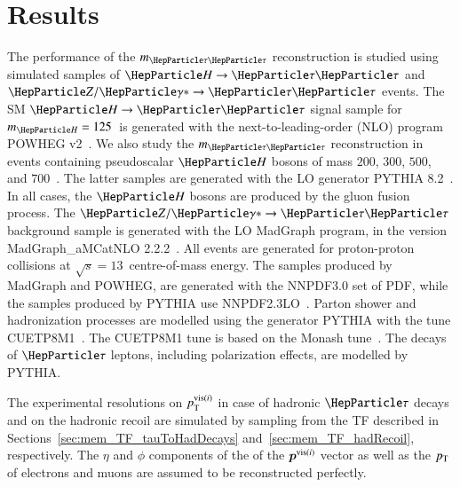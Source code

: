 \section{Results}
\label{sec:results}

The performance of the $m_{\Pgt\Pgt}$ reconstruction is studied using
simulated samples of $\PHiggs \to \Pgt\Pgt$ and $\PZ/\Pggx \to
\Pgt\Pgt$ events.
The SM $\PHiggs \to \Pgt\Pgt$ signal sample for $m_{\PHiggs} = 125$~\GeV is generated with the next-to-leading-order (NLO) program POWHEG v2~\cite{POWHEG1,POWHEG2,POWHEG3}.
We also study the $m_{\Pgt\Pgt}$ reconstruction in events containing pseudoscalar $\PHiggs$ bosons of mass $200$, $300$, $500$, and $700$~\GeV.
The latter samples are generated with the LO generator PYTHIA 8.2~\cite{pythia8}.
In all cases, the $\PHiggs$ bosons are produced by the gluon fusion process.
The $\PZ/\Pggx \to \Pgt\Pgt$ background sample is generated with the LO MadGraph program, in the version MadGraph\_aMCatNLO 2.2.2~\cite{MadGraph_aMCatNLO}.
All events are generated for proton-proton collisions at $\sqrt{s} = 13$~\TeV centre-of-mass energy.
The samples produced by MadGraph and POWHEG, are generated with the NNPDF3.0 set of PDF,
while the samples produced by PYTHIA use NNPDF2.3LO~\cite{NNPDF1,NNPDF2,NNPDF3}.
Parton shower and hadronization processes are modelled using the generator PYTHIA with the tune CUETP8M1~\cite{PYTHIA_CUETP8M1tune_CMS}.
The CUETP8M1 tune is based on the Monash tune~\cite{PYTHIA_MonashTune}.
The decays of $\Pgt$ leptons, including polarization effects, are modelled by PYTHIA.

The experimental resolutions on $p_{\textrm{T}}^{\textrm{vis}(i)}$ in case of hadronic
$\Pgt$ decays and on the hadronic recoil 
are simulated by sampling from the TF described in
Sections~\ref{sec:mem_TF_tauToHadDecays}
and~\ref{sec:mem_TF_hadRecoil}, respectively.
The $\eta$ and $\phi$ components of the of the $\bm{p}^{\textrm{vis}(i)}$ vector as well as the $p_{\textrm{T}}$ of electrons and muons are assumed to be reconstructed perfectly.

